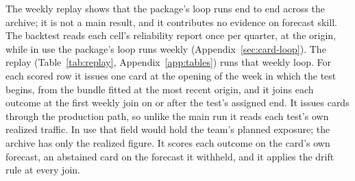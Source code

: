 The weekly replay shows that the package's loop runs end to end across the archive; it is not a main result, and it contributes no evidence on forecast skill. The backtest reads each cell's reliability report once per quarter, at the origin, while in use the package's loop runs weekly (Appendix~\ref{sec:card-loop}). The replay (Table~\ref{tab:replay}, Appendix~\ref{app:tables}) runs that weekly loop. For each scored row it issues one card at the opening of the week in which the test begins, from the bundle fitted at the most recent origin, and it joins each outcome at the first weekly join on or after the test's assigned end. It issues cards through the production path, so unlike the main run it reads each test's own realized traffic. In use that field would hold the team's planned exposure; the archive has only the realized figure. It scores each outcome on the card's own forecast, an abstained card on the forecast it withheld, and it applies the drift rule at every join.
